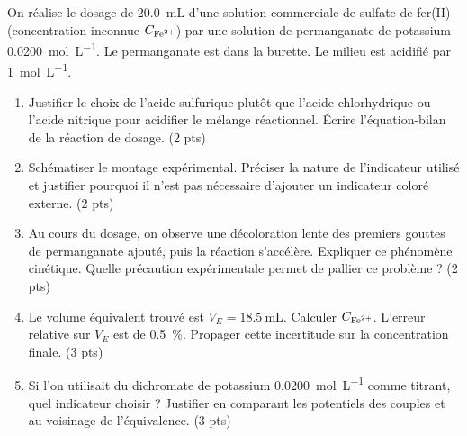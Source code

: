 \documentclass[11pt]{article}
\begin{document}
\begin{exercice}
On réalise le dosage de \SI{20,0}{\mL} d'une solution commerciale de sulfate de fer(II)  (concentration inconnue $C_{\ce{Fe^{2+}}}$) par une solution de permanganate de potassium  \SI{0,0200}{\mol\per\L}. Le permanganate est dans la burette. Le milieu est acidifié par  \SI{1}{\mol\per\L}.
\begin{enumerate}
    \item Justifier le choix de l'acide sulfurique plutôt que l'acide chlorhydrique ou l'acide nitrique pour acidifier le mélange réactionnel. Écrire l'équation-bilan de la réaction de dosage. (2 pts)
    \item Schématiser le montage expérimental. Préciser la nature de l'indicateur utilisé et justifier pourquoi il n'est pas nécessaire d'ajouter un indicateur coloré externe. (2 pts)
    \item Au cours du dosage, on observe une décoloration lente des premiers gouttes de permanganate ajouté, puis la réaction s'accélère. Expliquer ce phénomène cinétique. Quelle précaution expérimentale permet de pallier ce problème ? (2 pts)
    \item Le volume équivalent trouvé est $V_E = \SI{18,5}{\mL}$. Calculer $C_{\ce{Fe^{2+}}}$. L'erreur relative sur $V_E$ est de \SI{0,5}{\%}. Propager cette incertitude sur la concentration finale. (3 pts)
    \item Si l'on utilisait du dichromate de potassium  \SI{0,0200}{\mol\per\L} comme titrant, quel indicateur choisir ? Justifier en comparant les potentiels des couples  et  au voisinage de l'équivalence. (3 pts)
\end{enumerate}
\end{exercice}
\end{document}
